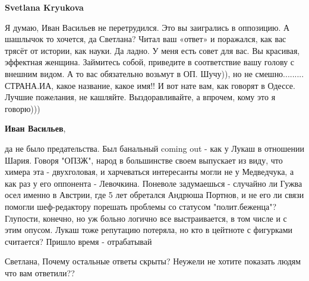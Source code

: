 \begin{itemize}
\begin{itemize}
 
\textbf{Svetlana Kryukova} 

Я думаю, Иван Васильев не перетрудился. Это вы заигрались в оппозицию. А
шашлычок то хочется, да Светлана? Читал ваш «ответ» и поражался, как вас трясёт
от истории, как науки. Да ладно. У меня есть совет для вас. Вы красивая,
эффектная женщина. Займитесь собой, приведите в соответствие вашу голову с
внешним видом. А то вас обязательно возьмут в ОП. Шучу)), но не смешно.........
СТРАНА.ИА, какое название, какое имя!! И вот нате вам, как говорят в Одессе.
Лучшие пожелания, не кашляйте. Выздоравливайте, а впрочем, кому это я говорю)))


 
\textbf{Иван Васильев}, 

да не было предательства. Был банальный coming out - как у Лукаш в отношении
Шария. Говоря "ОПЗЖ", народ в большинстве своем выпускает из виду, что химера
эта - двухголовая, и харчеваться интересанты могли не у Медведчука, а как раз у
его оппонента - Левочкина. Поневоле задумаешься - случайно ли Гужва осел именно
в Австрии, где 5 лет обретался Андрюша Портнов, и не его ли связи помогли
шеф-редактору порешать проблемы со статусом "полит.беженца"? Глупости, конечно,
но уж больно логично все выстраивается, в том числе и с этим опусом. Лукаш тоже
репутацию потеряла, но кто в цейтноте с фигурками считается? Пришло время -
отрабатывай

 
Светлана, Почему остальные ответы скрыты? Неужели не хотите показать людям что вам ответили??

 

\end{itemize}
\end{itemize}
